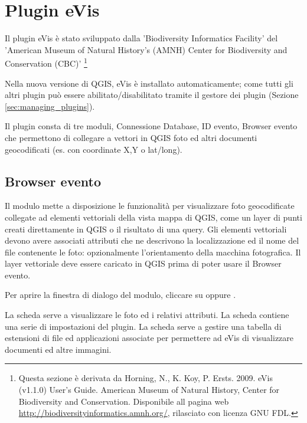 

\section{Plugin eVis}\label{sec:evis}

Il plugin eVis è stato sviluppato dalla 'Biodiversity Informatics Facility' del 'American Museum 
of Natural History's (AMNH) Center for Biodiversity and Conservation (CBC)' \footnote{Questa sezione 
è derivata da Horning, N., K. Koy, P. Ersts. 2009. eVis (v1.1.0) User's Guide. American Museum of
Natural History, Center for Biodiversity and Conservation. 
Disponibile all pagina web \url{http://biodiversityinformatics.amnh.org/}, rilasciato con licenza GNU FDL.} 

Nella nuova versione di QGIS, eVis è installato automaticamente; come tutti gli altri plugin può 
essere abilitato/disabilitato tramite il gestore dei plugin (Sezione \ref{sec:managing_plugins}).

Il plugin consta di tre moduli, Connessione Database, ID evento, Browser evento che permettono di collegare 
a vettori in QGIS foto ed altri documenti geocodificati (es. con coordinate X,Y o lat/long).  

\subsection{Browser evento}\label{evis_browser}

Il modulo mette a disposizione le funzionalità per visualizzare foto geocodificate collegate ad elementi
vettoriali della vista mappa di QGIS, come un layer di punti creati direttamente in QGIS o il risultato
di una query. Gli elementi vettoriali devono avere associati attributi che ne descrivono la localizzazione
ed il nome del file contenente le foto: opzionalmente l'orientamento della macchina fotografica. Il 
layer vettoriale deve essere caricato in QGIS prima di poter usare il Browser evento.

\label{evis_launch_browser}

Per aprire la finestra di dialogo del modulo, cliccare su  oppure 
 \arrow {} \arrow {}. 

La scheda  serve a visualizzare le foto ed i relativi attributi. La scheda 
contiene una serie di impostazioni del plugin. La scheda  serve a
gestire una tabella di estensioni di file ed applicazioni associate per permettere ad eVis di visualizzare 
documenti ed altre immagini.      

